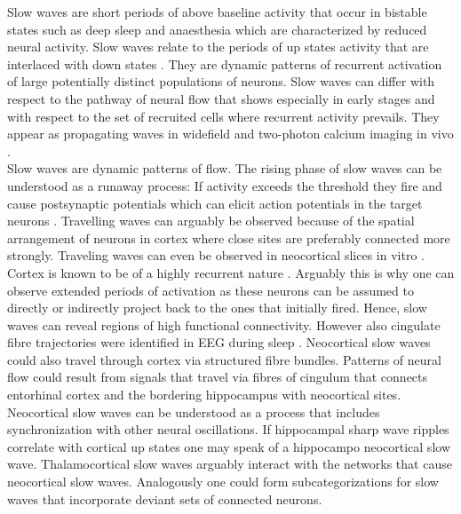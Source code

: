 Slow waves are short periods of above baseline activity that occur in bistable states such as deep sleep and anaesthesia which are characterized by reduced neural activity. Slow waves relate to the periods of up states activity that are interlaced with down states \parencite{jercog2017up}. They are dynamic patterns of recurrent activation of large potentially distinct populations of neurons. Slow waves can differ with respect to the pathway of neural flow that shows especially in early stages and with respect to the set of recruited cells where recurrent activity prevails. They appear as propagating waves in widefield and two-photon calcium imaging in vivo \parencite{celotto2020analysis, niethard2018cortical}.\\
Slow waves are dynamic patterns of flow. The rising phase of slow waves can be understood as a runaway process: If activity exceeds the threshold they fire and cause postsynaptic potentials which can elicit action potentials in the target neurons \parencite{nghiem2018two}. Travelling waves can arguably be observed because of the spatial arrangement of neurons in cortex where close sites are preferably connected more strongly. Traveling waves can even be observed in neocortical slices in vitro \parencite{wu2008propagating}. Cortex is known to be of a highly recurrent nature \parencite{guamuanuct2017mouse}. Arguably this is why one can observe extended periods of activation as these neurons can be assumed to directly or indirectly project back to the ones that initially fired. Hence, slow waves can reveal regions of high functional connectivity. However also cingulate fibre trajectories were identified in EEG during sleep \parencite{murphy2009source}. Neocortical slow waves could also travel through cortex via structured fibre bundles. Patterns of neural flow could result from signals that travel via fibres of cingulum that connects entorhinal cortex and the bordering hippocampus with neocortical sites.\\
Neocortical slow waves can be understood as a process that includes synchronization with other neural oscillations. If hippocampal sharp wave ripples correlate with cortical up states one may speak of a hippocampo neocortical slow wave. Thalamocortical slow waves arguably interact with the networks that cause neocortical slow waves. Analogously one could form subcategorizations for slow waves that incorporate deviant sets of connected neurons.\\
